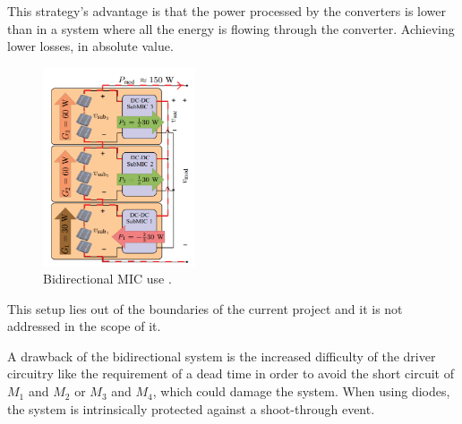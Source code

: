 This strategy's advantage is that the power processed by the converters is lower than in a system where all the energy is flowing through the converter. Achieving lower losses, in absolute value. \cite{ArchitectureMIC}

\begin{figure}[H]
	\begin{center}
		\includegraphics[width=0.4\textwidth]{../Pictures/bidirectional_mic_use}
		\caption{Bidirectional MIC use \cite{ArchitectureMIC}.}
		\label{BID_MIC_ARCHITECTURES}
	\end{center}	
\end{figure}

This setup lies out of the boundaries of the current project and it is not addressed in the scope of it.
		
A drawback of the bidirectional system is the increased difficulty of the driver circuitry like the requirement of a dead time in order to avoid the short circuit of $M_1$ and $M_2$ or $M_3$ and $M_4$, which could damage the system. When using diodes, the system is intrinsically protected against a shoot-through event.
		

